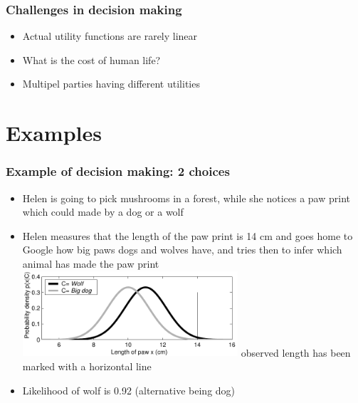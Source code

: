 \documentclass[10pt]{beamer}
\begin{document}
\begin{frame}

\frametitle{Challenges in decision making}

  \begin{itemize}
  \item Actual utility functions are rarely linear
  \item<2-> What is the cost of human life?
  \item<3-> Multipel parties having different utilities
  \end{itemize}

\end{frame}

\section{Examples}
\frame{\sectionpage}

\begin{frame}

\frametitle{Example of decision making: 2 choices}

\begin{itemize}
\item<+-> Helen is going to pick mushrooms in a forest, while she notices a paw print which could made by a dog or a wolf
\item<+-> Helen measures that the length of the paw print is 14 cm and
  goes home to Google how big paws dogs and wolves have, and tries
  then to infer which animal has made the paw print
  \includegraphics[width=8cm]{figs/hatutus_likelihoods}
  observed length has been marked with a horizontal line
\item<+-> Likelihood of wolf is 0.92 (alternative being dog)
\end{itemize}

\end{frame}
\end{document}

